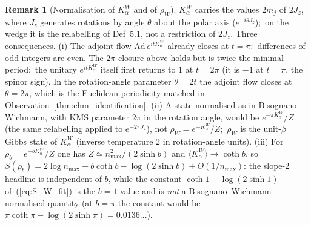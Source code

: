 \documentclass[11pt,a4paper]{article}
\theoremstyle{plain}
\theoremstyle{definition}
\newtheorem{remark}[theorem]{Remark}
\newcommand{\nmax}{n_{\max}}
\newcommand{\Kalpha}{K_{\alpha}^{W}}
\newcommand{\rhoW}{\rho_{W}}
\begin{document}
\begin{remark}[Normalisation of $\Kalpha$ and of $\rhoW$]
\label{rem:bw_normalisation}
$\Kalpha$ carries the values $2m_j$ of $2J_{z}$, where $J_{z}$
generates rotations by angle $\theta$ about the polar axis
($e^{-i\theta J_{z}}$);\ on the wedge it is the relabelling of
\cite{paper42} Def~5.1, not a restriction of $2J_z$. Three consequences. (i) The adjoint flow
$\mathrm{Ad}\,e^{it\Kalpha}$ already closes at $t = \pi$:\ differences
of odd integers are even. The $2\pi$ closure above holds but is twice
the minimal period;\ the unitary $e^{it\Kalpha}$ itself first returns
to $1$ at $t = 2\pi$ (it is $-1$ at $t = \pi$, the spinor sign). In the
rotation-angle parameter $\theta = 2t$ the adjoint flow closes at
$\theta = 2\pi$, which is the Euclidean periodicity matched in
Observation~\ref{thm:chm_identification}. (ii) A state normalised as in
Bisognano--Wichmann, with KMS parameter $2\pi$ in the rotation angle,
would be $e^{-\pi\Kalpha}/Z$ (the same relabelling applied to
$e^{-2\pi J_{z}}$), not
$\rhoW = e^{-\Kalpha}/Z$;\ $\rhoW$ is the unit-$\beta$ Gibbs state of
$\Kalpha$ (inverse temperature $2$ in rotation-angle units). (iii) For
$\rho_{b} = e^{-b\Kalpha}/Z$ one has $Z \simeq \nmax^{2}/(2\sinh b)$ and
$\langle\Kalpha\rangle \to \coth b$, so
$S(\rho_{b}) = 2\log\nmax + b\coth b - \log(2\sinh b) + O(1/\nmax)$:
the slope-$2$ headline is independent of $b$, while the constant
$\coth 1 - \log(2\sinh 1)$ of~(\ref{eq:S_W_fit}) is the $b = 1$ value
and is \emph{not} a Bisognano--Wichmann-normalised quantity (at
$b = \pi$ the constant would be $\pi\coth\pi - \log(2\sinh\pi) =
0.0136\ldots$).
\end{remark}
\end{document}
